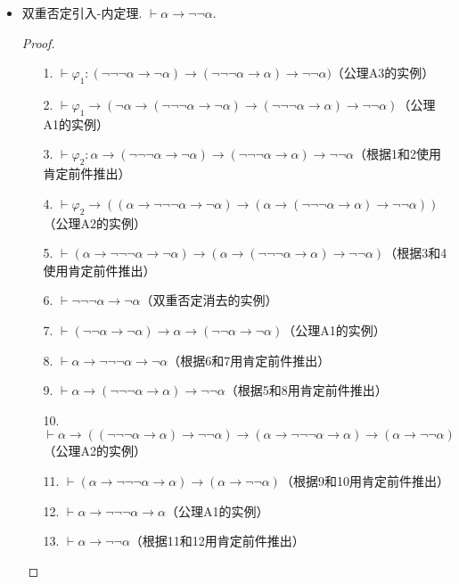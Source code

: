 \documentclass[main.tex]{subfiles}
\begin{document}
\begin{itemize}
    \item 双重否定引入-内定理. \(\vdash \alpha \to \neg \neg \alpha\).
    \begin{proof}
        \begin{itemize}
            \item [1.] \(\vdash \varphi_1: (\neg \neg \neg \alpha \to \neg \alpha) \to (\neg \neg \neg \alpha \to \alpha) \to \neg \neg \alpha)\)（公理A3的实例）
            \item [2.] \(\vdash \varphi_1 \to (\neg \alpha \to (\neg \neg \neg \alpha \to \neg \alpha) \to (\neg \neg \neg \alpha \to \alpha) \to \neg \neg \alpha)\)（公理A1的实例）
            \item [3.] \(\vdash \varphi_2: \alpha \to (\neg \neg \neg \alpha \to \neg \alpha) \to (\neg \neg \neg \alpha \to \alpha) \to \neg \neg \alpha\)（根据1和2使用肯定前件推出）
            \item [4.] \(\vdash \varphi_2 \to ((\alpha \to \neg \neg \neg \alpha \to \neg \alpha) \to (\alpha \to (\neg \neg \neg \alpha \to \alpha) \to \neg \neg \alpha))\)（公理A2的实例）
            \item [5.] \(\vdash (\alpha \to \neg \neg \neg \alpha \to \neg \alpha) \to (\alpha \to (\neg \neg \neg \alpha \to \alpha) \to \neg \neg \alpha)\)（根据3和4使用肯定前件推出）
            \item [6.] \(\vdash \neg \neg \neg \alpha \to \neg \alpha\)（双重否定消去的实例）
            \item [7.] \(\vdash (\neg \neg \alpha \to \neg \alpha) \to \alpha \to (\neg \neg \alpha \to \neg \alpha)\)（公理A1的实例）
            \item [8.] \(\vdash \alpha \to \neg \neg \neg \alpha \to \neg \alpha\)（根据6和7用肯定前件推出）
            \item [9.] \(\vdash \alpha \to (\neg \neg \neg \alpha \to \alpha) \to \neg \neg \alpha\)（根据5和8用肯定前件推出）
            \item [10.] \(\vdash \alpha \to ((\neg \neg \neg \alpha \to \alpha) \to \neg \neg \alpha) \to (\alpha \to \neg \neg \neg \alpha \to \alpha) \to (\alpha \to \neg \neg \alpha)\)（公理A2的实例）
            \item [11.] \(\vdash (\alpha \to \neg \neg \neg \alpha \to \alpha) \to (\alpha \to \neg \neg \alpha)\)（根据9和10用肯定前件推出）
            \item [12.] \(\vdash \alpha \to \neg \neg \neg \alpha \to \alpha\)（公理A1的实例）
            \item [13.] \(\vdash \alpha \to \neg \neg \alpha\)（根据11和12用肯定前件推出）
         \end{itemize}
    \end{proof}


\end{itemize}
\end{document}

